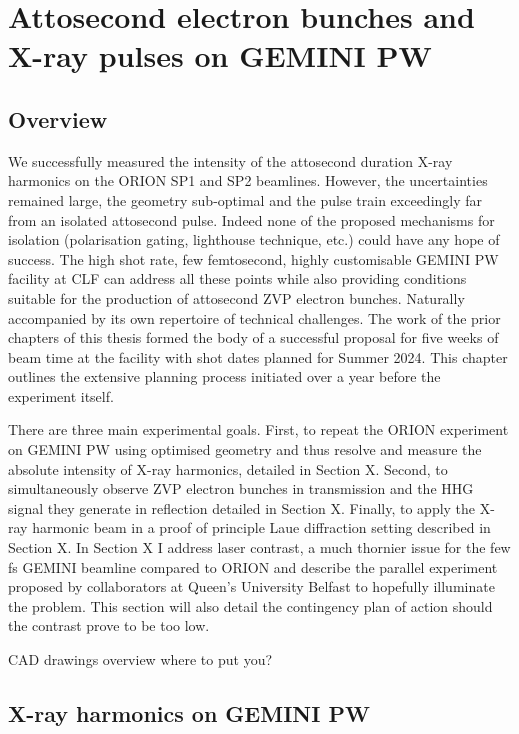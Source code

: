 \chapter{\label{ch:4-gemini}Attosecond electron bunches and X-ray pulses on GEMINI PW} 

\minitoc

\section{Overview}

We successfully measured the intensity of the attosecond duration X-ray harmonics on the ORION SP1 and SP2 beamlines. However, the uncertainties remained large, the geometry sub-optimal and the pulse train exceedingly far from an isolated attosecond pulse. Indeed none of the proposed mechanisms for isolation (polarisation gating, lighthouse technique, etc.) could have any hope of success. The high shot rate, few femtosecond, highly customisable GEMINI PW facility at CLF can address all these points while also providing conditions suitable for the production of attosecond ZVP electron bunches. Naturally accompanied by its own repertoire of technical challenges. The work of the prior chapters of this thesis formed the body of a successful proposal for five weeks of beam time at the facility with shot dates planned for Summer 2024. This chapter outlines the extensive planning process initiated over a year before the experiment itself.

There are three main experimental goals. First, to repeat the ORION experiment on GEMINI PW using optimised geometry and thus resolve and measure the absolute intensity of X-ray harmonics, detailed in Section X. Second, to simultaneously observe ZVP electron bunches in transmission and the HHG signal they generate in reflection detailed in Section X. Finally, to apply the X-ray harmonic beam in a proof of principle Laue diffraction setting described in Section X. In Section X I address laser contrast, a much thornier issue for the few fs GEMINI beamline compared to ORION and describe the parallel experiment proposed by collaborators at Queen's University Belfast to hopefully illuminate the problem. This section will also detail the contingency plan of action should the contrast prove to be too low.

CAD drawings overview where to put you?

\section{X-ray harmonics on GEMINI PW}

